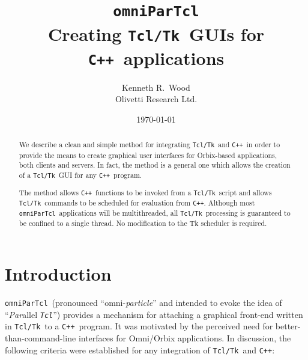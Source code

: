 \documentclass[11pt]{article}
\def\omniParTcl{{\tt omniParTcl}}
\def\tcltk{{\tt Tcl/Tk}}
\def\tcl{{\tt Tcl}}
\def\CXX{{\tt C++}}
\begin{document}
  
\title{{\bf \omniParTcl}\\
       {\normalsize Creating \tcltk\ GUIs for \CXX\ applications}}
\author{Kenneth R.\ Wood\\
        Olivetti Research Ltd.}
\date{\today} 
\maketitle

\begin{abstract}
\noindent
We describe a clean and simple method for integrating \tcltk\ and \CXX\ 
in order to provide the means to create graphical user interfaces for
Orbix-based applications, both clients and servers.  In fact, the method
is a general one which allows the creation of a \tcltk\ GUI for any \CXX\ 
program.

The method allows \CXX\ functions to be invoked from a \tcltk\ script and
allows \tcltk\ commands to be scheduled for evaluation from \CXX.  
Although most \omniParTcl\ applications will be multithreaded,
all \tcltk\ processing is guaranteed to be confined to a single thread.
No modification to the Tk scheduler is required.
\end{abstract}

\section{Introduction}

\omniParTcl\ (pronounced ``omni-{\em particle}'' and intended to
evoke the idea of ``{\em Par\/}allel {\em \tcl\/}'') provides a mechanism
for attaching a graphical front-end written in \tcltk\ to a \CXX\ 
program.  It was motivated by the perceived need for
better-than-command-line interfaces for Omni/Orbix applications.  In
discussion, the following criteria were established for any integration
of \tcltk\ and \CXX:
\end{document}
